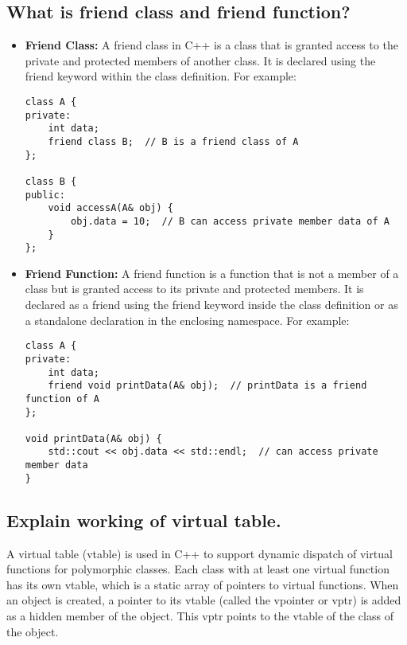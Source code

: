 \subsection{What is friend class and friend function?}
\begin{itemize}
\item \textbf{Friend Class:} A friend class in C++ is a class that is granted access to the private and protected members of another class. It is declared using the friend keyword within the class definition. For example:
\begin{tcolorbox}[title=Friend Class]
\begin{verbatim}
class A {
private:
    int data;
    friend class B;  // B is a friend class of A
};

class B {
public:
    void accessA(A& obj) {
        obj.data = 10;  // B can access private member data of A
    }
};
\end{verbatim}
\end{tcolorbox}
\item \textbf{Friend Function:} A friend function is a function that is not a member of a class but is granted access to its private and protected members. It is declared as a friend using the friend keyword inside the class definition or as a standalone declaration in the enclosing namespace. For example:
\begin{tcolorbox}[title=Friend Function]
\begin{verbatim}
class A {
private:
    int data;
    friend void printData(A& obj);  // printData is a friend function of A
};

void printData(A& obj) {
    std::cout << obj.data << std::endl;  // can access private member data
}
\end{verbatim}
\end{tcolorbox}
\end{itemize}

\subsection{Explain working of virtual table.}
A virtual table (vtable) is used in C++ to support dynamic dispatch of virtual functions for polymorphic classes. Each class with at least one virtual function has its own vtable, which is a static array of pointers to virtual functions. When an object is created, a pointer to its vtable (called the vpointer or vptr) is added as a hidden member of the object. This vptr points to the vtable of the class of the object.
